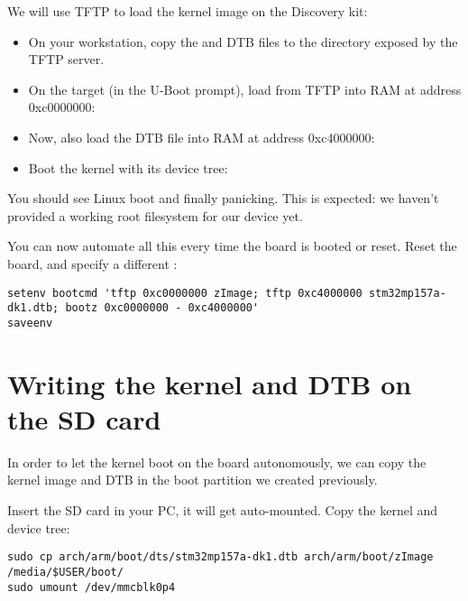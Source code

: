 
We will use TFTP to load the kernel image on the Discovery kit:

\begin{itemize}

\item On your workstation, copy the  and DTB files to the
  directory exposed by the TFTP server.

\item On the target (in the U-Boot prompt), load  from
  TFTP into RAM at address 0xc0000000:\\

\item Now, also load the DTB file into RAM at address 0xc4000000:\\

\item Boot the kernel with its device tree:\\

\end{itemize}

You should see Linux boot and finally panicking. This is expected: we
haven't provided a working root filesystem for our device yet.

You can now automate all this every time the board is booted or
reset. Reset the board, and specify a different :

{\scriptsize
\begin{verbatim}
setenv bootcmd 'tftp 0xc0000000 zImage; tftp 0xc4000000 stm32mp157a-dk1.dtb; bootz 0xc0000000 - 0xc4000000'
saveenv
\end{verbatim}
}

\section{Writing the kernel and DTB on the SD card}

In order to let the kernel boot on the board autonomously, we can
copy the kernel image and DTB in the boot partition we created
previously.

Insert the SD card in your PC, it will get auto-mounted. Copy the
kernel and device tree:
\begin{verbatim}
sudo cp arch/arm/boot/dts/stm32mp157a-dk1.dtb arch/arm/boot/zImage /media/$USER/boot/
sudo umount /dev/mmcblk0p4
\end{verbatim}

